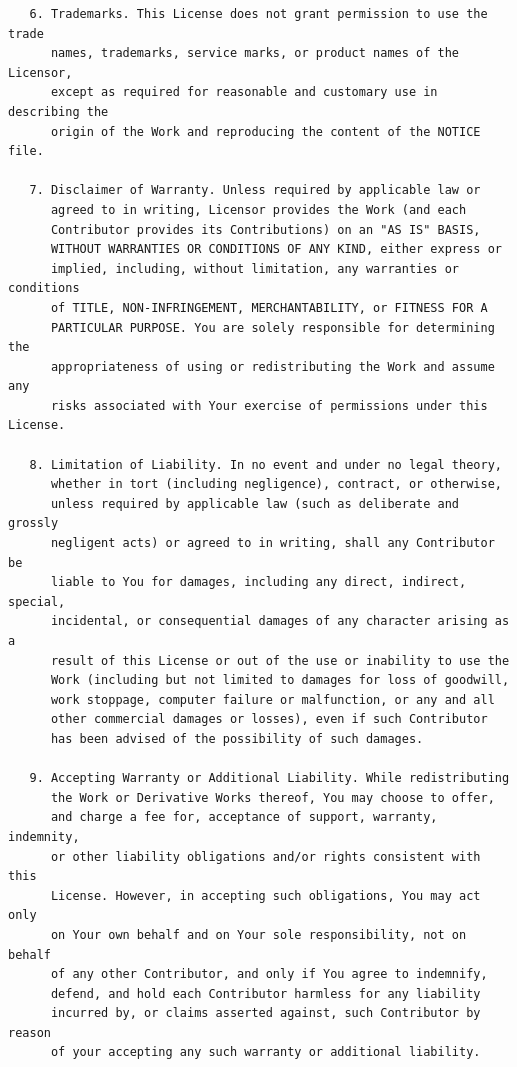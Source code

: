 \begin{verbatim}
   6. Trademarks. This License does not grant permission to use the trade
      names, trademarks, service marks, or product names of the Licensor,
      except as required for reasonable and customary use in describing the
      origin of the Work and reproducing the content of the NOTICE file.

   7. Disclaimer of Warranty. Unless required by applicable law or
      agreed to in writing, Licensor provides the Work (and each
      Contributor provides its Contributions) on an "AS IS" BASIS,
      WITHOUT WARRANTIES OR CONDITIONS OF ANY KIND, either express or
      implied, including, without limitation, any warranties or conditions
      of TITLE, NON-INFRINGEMENT, MERCHANTABILITY, or FITNESS FOR A
      PARTICULAR PURPOSE. You are solely responsible for determining the
      appropriateness of using or redistributing the Work and assume any
      risks associated with Your exercise of permissions under this License.

   8. Limitation of Liability. In no event and under no legal theory,
      whether in tort (including negligence), contract, or otherwise,
      unless required by applicable law (such as deliberate and grossly
      negligent acts) or agreed to in writing, shall any Contributor be
      liable to You for damages, including any direct, indirect, special,
      incidental, or consequential damages of any character arising as a
      result of this License or out of the use or inability to use the
      Work (including but not limited to damages for loss of goodwill,
      work stoppage, computer failure or malfunction, or any and all
      other commercial damages or losses), even if such Contributor
      has been advised of the possibility of such damages.

   9. Accepting Warranty or Additional Liability. While redistributing
      the Work or Derivative Works thereof, You may choose to offer,
      and charge a fee for, acceptance of support, warranty, indemnity,
      or other liability obligations and/or rights consistent with this
      License. However, in accepting such obligations, You may act only
      on Your own behalf and on Your sole responsibility, not on behalf
      of any other Contributor, and only if You agree to indemnify,
      defend, and hold each Contributor harmless for any liability
      incurred by, or claims asserted against, such Contributor by reason
      of your accepting any such warranty or additional liability.
\end{verbatim}

